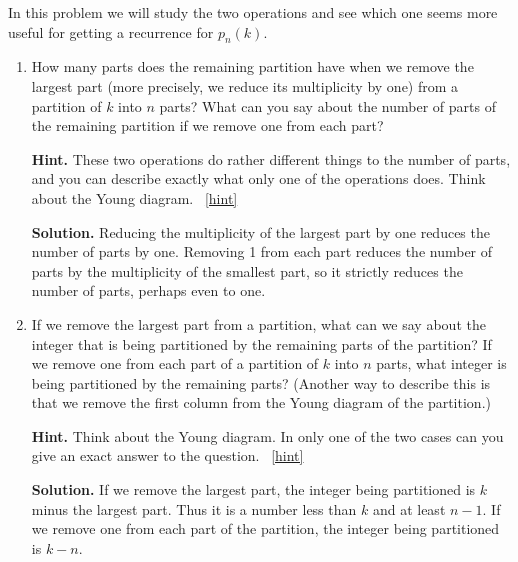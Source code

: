 \documentclass{book}
\begin{document}
\setcounter{project}{215}
\addtocounter{project}{-1}
\begin{activity}[]\label{numberpartitionrecurrence}
\hypertarget{p-1158}{}%
In this problem we will study the two operations and see which one seems more useful for getting a recurrence for \(p_n(k)\).%
\begin{enumerate}[font=\bfseries,label=(\alph*),ref=\alph*]
\item\label{task-219} \hypertarget{p-1159}{}%
How many parts does the remaining partition have when we remove the largest part (more precisely, we reduce its multiplicity by one) from a partition of \(k\) into \(n\) parts?  What can you say about the number of parts of the remaining partition if we remove one from each part?%
\par\smallskip%
\noindent\textbf{Hint.}\hypertarget{hint-134}{}\quad%
\hypertarget{p-1160}{}%
These two operations do rather different things to the number of parts, and you can describe exactly what only one of the operations does. Think about the Young diagram.%
~\hfill{\tiny\hyperlink{a-215.a}{[hint]}\hypertarget{q-215.a}{}}\par\smallskip%
\noindent\textbf{Solution.}\hypertarget{solution-105}{}\quad%
\hypertarget{p-1161}{}%
Reducing the multiplicity of the largest part by one reduces the number of parts by one. Removing 1 from each part reduces the number of parts by the multiplicity of the smallest part, so it strictly reduces the number of parts, perhaps even to one.%
\item\label{task-220} \hypertarget{p-1162}{}%
If we remove the largest part from a partition, what can we say about the integer that is being partitioned by the remaining parts of the partition? If we remove one from each part of a partition of \(k\) into \(n\) parts, what integer is being partitioned by the remaining parts? (Another way to describe this is that we remove the first column from the Young diagram of the partition.)%
\par\smallskip%
\noindent\textbf{Hint.}\hypertarget{hint-135}{}\quad%
\hypertarget{p-1163}{}%
Think about the Young diagram. In only one of the two cases can you give an exact answer to the question.%
~\hfill{\tiny\hyperlink{a-215.b}{[hint]}\hypertarget{q-215.b}{}}\par\smallskip%
\noindent\textbf{Solution.}\hypertarget{solution-106}{}\quad%
\hypertarget{p-1164}{}%
If we remove the largest part, the integer being partitioned is \(k\) minus the largest part. Thus it is a number less than \(k\) and at least \(n-1\). If we remove one from each part of the partition, the integer being partitioned is \(k-n\).%

\end{enumerate}
\end{activity}
\end{document}
